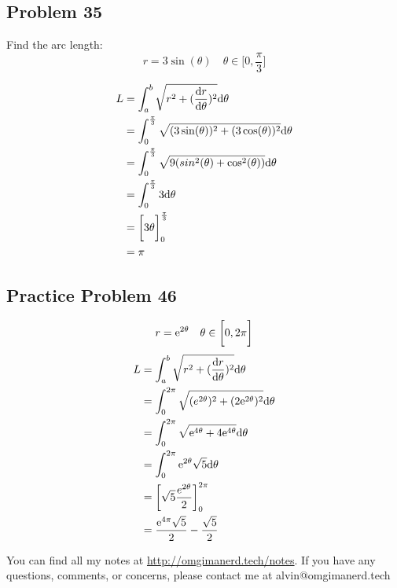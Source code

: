 \documentclass{math}
\begin{document}
\subsection*{Problem 35}
Find the arc length:
\[ r = 3\sin(\theta) \quad \theta\in\bigg[0,\frac{\pi}{3}\bigg] \]
\begin{center}
\end{center}
\begin{align*}
  L &= \int_{a}^{b}{\sqrt{r^{2}+(\frac{\mathrm{d}{r}}{\mathrm{d}{\theta}})^{2}}\mathrm{d}{\theta}} \\
  &= \int_{0}^{\frac{\pi}{3}}
    {\sqrt{(3\sin(\theta))^{2}+(3\cos(\theta))^{2}}\mathrm{d}{\theta}} \\
  &= \int_{0}^{\frac{\pi}{3}}
    {\sqrt{9(sin^{2}(\theta)+\cos^{2}(\theta))}\mathrm{d}{\theta}} \\
  &= \int_{0}^{\frac{\pi}{3}}{3\mathrm{d}{\theta}} \\
  &= \bigg[3\theta\bigg]_{0}^{\frac{\pi}{3}} \\
  &= \pi
\end{align*}

\subsection*{Practice Problem 46}
\[ r = \mathrm{e}^{2\theta} \quad \theta\in\bigg[0,2\pi\bigg] \]
\begin{align*}
  L &= \int_{a}^{b}{\sqrt{r^{2}+(\frac{\mathrm{d}{r}}{\mathrm{d}{\theta}})^{2}}\mathrm{d}{\theta}} \\
  &= \int_{0}^{2\pi}
    {\sqrt{(e^{2\theta})^{2}+(2\mathrm{e}^{2\theta})^{2}}\mathrm{d}{\theta}} \\
  &= \int_{0}^{2\pi}{\sqrt{\mathrm{e}^{4\theta}+4\mathrm{e}^{4\theta}}\mathrm{d}{\theta}} \\
  &= \int_{0}^{2\pi}{\mathrm{e}^{2\theta}\sqrt{5}\mathrm{d}{\theta}} \\
  &= \bigg[\sqrt{5}\frac{e^{2\theta}}{2}\bigg]_{0}^{2\pi} \\
  &= \frac{\mathrm{e}^{4\pi}\sqrt{5}}{2}-\frac{\sqrt{5}}{2}
\end{align*}

\begin{center}
  You can find all my notes at \url{http://omgimanerd.tech/notes}. If you have
  any questions, comments, or concerns, please contact me at
  alvin@omgimanerd.tech
\end{center}
\end{document}
